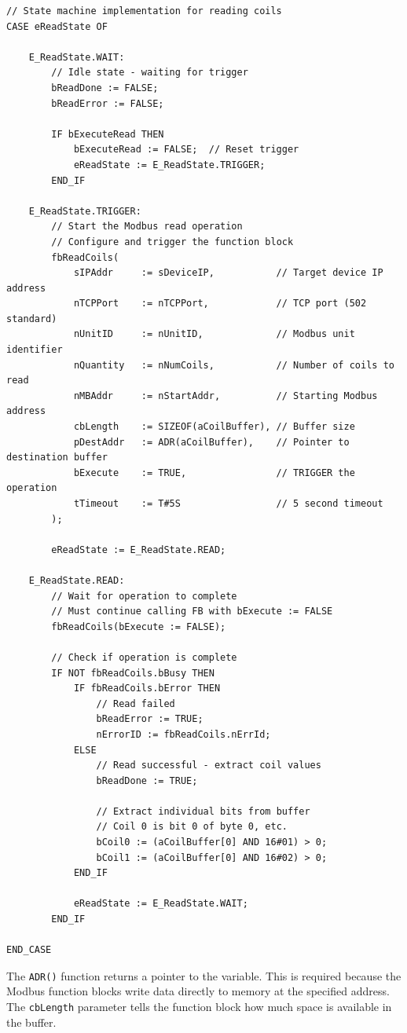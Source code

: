 \documentclass[11pt,a4paper]{article}
\begin{document}
\begin{lstlisting}
// State machine implementation for reading coils
CASE eReadState OF

    E_ReadState.WAIT:
        // Idle state - waiting for trigger
        bReadDone := FALSE;
        bReadError := FALSE;
        
        IF bExecuteRead THEN
            bExecuteRead := FALSE;  // Reset trigger
            eReadState := E_ReadState.TRIGGER;
        END_IF
        
    E_ReadState.TRIGGER:
        // Start the Modbus read operation
        // Configure and trigger the function block
        fbReadCoils(
            sIPAddr     := sDeviceIP,           // Target device IP address
            nTCPPort    := nTCPPort,            // TCP port (502 standard)
            nUnitID     := nUnitID,             // Modbus unit identifier
            nQuantity   := nNumCoils,           // Number of coils to read
            nMBAddr     := nStartAddr,          // Starting Modbus address
            cbLength    := SIZEOF(aCoilBuffer), // Buffer size
            pDestAddr   := ADR(aCoilBuffer),    // Pointer to destination buffer
            bExecute    := TRUE,                // TRIGGER the operation
            tTimeout    := T#5S                 // 5 second timeout
        );
        
        eReadState := E_ReadState.READ;
        
    E_ReadState.READ:
        // Wait for operation to complete
        // Must continue calling FB with bExecute := FALSE
        fbReadCoils(bExecute := FALSE);
        
        // Check if operation is complete
        IF NOT fbReadCoils.bBusy THEN
            IF fbReadCoils.bError THEN
                // Read failed
                bReadError := TRUE;
                nErrorID := fbReadCoils.nErrId;
            ELSE
                // Read successful - extract coil values
                bReadDone := TRUE;
                
                // Extract individual bits from buffer
                // Coil 0 is bit 0 of byte 0, etc.
                bCoil0 := (aCoilBuffer[0] AND 16#01) > 0;
                bCoil1 := (aCoilBuffer[0] AND 16#02) > 0;
            END_IF
            
            eReadState := E_ReadState.WAIT;
        END_IF

END_CASE
\end{lstlisting}

\begin{notebox}
The \texttt{ADR()} function returns a pointer to the variable. This is required because the Modbus function blocks write data directly to memory at the specified address. The \texttt{cbLength} parameter tells the function block how much space is available in the buffer.
\end{notebox}
\end{document}
